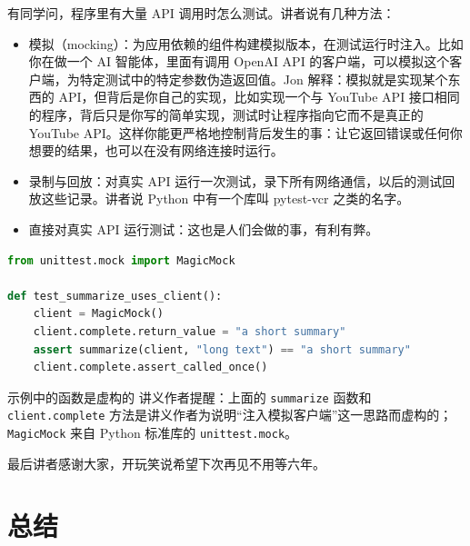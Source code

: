 \documentclass[a4paper]{article}
\begin{document}
有同学问，程序里有大量 API 调用时怎么测试。讲者说有几种方法：
\begin{itemize}
\item 模拟（mocking）：为应用依赖的组件构建模拟版本，在测试运行时注入。比如你在做一个 AI 智能体，里面有调用 OpenAI API 的客户端，可以模拟这个客户端，为特定测试中的特定参数伪造返回值。Jon 解释：模拟就是实现某个东西的 API，但背后是你自己的实现，比如实现一个与 YouTube API 接口相同的程序，背后只是你写的简单实现，测试时让程序指向它而不是真正的 YouTube API。这样你能更严格地控制背后发生的事：让它返回错误或任何你想要的结果，也可以在没有网络连接时运行。
\item 录制与回放：对真实 API 运行一次测试，录下所有网络通信，以后的测试回放这些记录。讲者说 Python 中有一个库叫 pytest-vcr 之类的名字。
\item 直接对真实 API 运行测试：这也是人们会做的事，有利有弊。
\end{itemize}

\begin{lstlisting}[language=Python]
from unittest.mock import MagicMock

def test_summarize_uses_client():
    client = MagicMock()
    client.complete.return_value = "a short summary"
    assert summarize(client, "long text") == "a short summary"
    client.complete.assert_called_once()
\end{lstlisting}

\begin{warningbox}{示例中的函数是虚构的}
讲义作者提醒：上面的 \texttt{summarize} 函数和 \texttt{client.complete} 方法是讲义作者为说明“注入模拟客户端”这一思路而虚构的；\texttt{MagicMock} 来自 Python 标准库的 \texttt{unittest.mock}。
\end{warningbox}

最后讲者感谢大家，开玩笑说希望下次再见不用等六年。

\section{总结}
\end{document}
